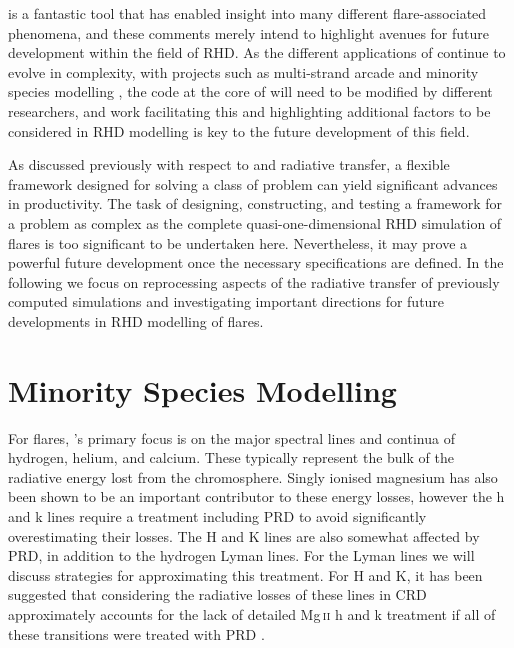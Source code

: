 \Radyn{} is a fantastic tool that has enabled insight into many different flare-associated phenomena, and these comments merely intend to highlight avenues for future development within the field of RHD.
As the different applications of \Radyn{} continue to evolve in complexity, with projects such as multi-strand arcade and minority species modelling \citep[e.g.][]{Kerr2019,Polito2019,Kerr2020}, the code at the core of \Radyn{} will need to be modified by different researchers, and work facilitating this and highlighting additional factors to be considered in RHD modelling is key to the future development of this field.

As discussed previously with respect to \Lw{} and radiative transfer, a flexible framework designed for solving a class of problem can yield significant advances in productivity.
The task of designing, constructing, and testing a framework for a problem as complex as the complete quasi-one-dimensional RHD simulation of flares is too significant to be undertaken here.
Nevertheless, it may prove a powerful future development once the necessary specifications are defined.
In the following we focus on reprocessing aspects of the radiative transfer of previously computed \Radyn{} simulations and investigating important directions for future developments in RHD modelling of flares.

\section{Minority Species Modelling}

For flares, \Radyn{}'s primary focus is on the major spectral lines and continua of hydrogen, helium, and calcium.
These typically represent the bulk of the radiative energy lost from the chromosphere.
Singly ionised magnesium has also been shown to be an important contributor to these energy losses, however the h and k lines require a treatment including PRD to avoid significantly overestimating their losses.
The \Caii{} H and K lines are also somewhat affected by PRD, in addition to the hydrogen Lyman lines.
For the Lyman lines we will discuss strategies for approximating this treatment.
For \Caii{} H and K, it has been suggested that considering the radiative losses of these lines in CRD approximately accounts for the lack of detailed Mg\,\textsc{ii} h and k treatment if all of these transitions were treated with PRD \citep{Carlsson2002, Kerr2019a}.

